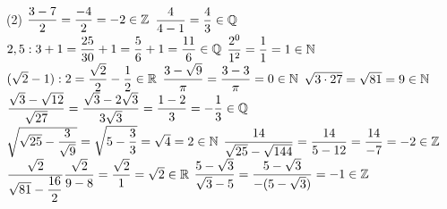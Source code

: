 \documentclass[a4paper,12pt]{report}
\begin{document}
\begin{core}
	\phantom{}
\begin{tasks}(2)
	\task $\dfrac{3-7}{2}=\dfrac{-4}{2}=-2\in \mathbb Z$
	\task $\dfrac{4}{4-1}=\dfrac{4}{3}\in \mathbb Q$
	\task $2,5: 3+1=\dfrac{25}{30}+1=\dfrac{5}{6}+1=\dfrac{11}{6}\in\mathbb Q$
	\task $\dfrac{2^0}{1^2}=\dfrac{1}{1}=1\in \mathbb N$
	\task $(\sqrt{2}-1): 2=\dfrac{\sqrt{2}}{2}-\dfrac{1}{2}\in\mathbb R$
	\task $\dfrac{3-\sqrt{9}}{\pi}=\dfrac{3-3}{\pi}=0\in \mathbb N$
	\task $\sqrt{3 \cdot 27}=\sqrt{81}=9\in \mathbb N$
	\task $\dfrac{\sqrt{3}-\sqrt{12}}{\sqrt{27}}=\dfrac{\sqrt{3}-2\sqrt{3}}{3\sqrt{3}}=\dfrac{1-2}{3}=-\dfrac{1}{3}\in\mathbb Q$
	\task $\sqrt{\sqrt{25}-\dfrac{3}{\sqrt{9}}}=\sqrt{5-\dfrac{3}{3}}=\sqrt{4}=2\in \mathbb N$
	\task $\dfrac{14}{\sqrt{25}-\sqrt{144}}=\dfrac{14}{5-12}=\dfrac{14}{-7}=-2\in\mathbb Z$
	\task $\dfrac{\sqrt{2}}{\sqrt{81}-\dfrac{16}{2}}\dfrac{\sqrt{2}}{9-8}=\dfrac{\sqrt{2}}{1}=\sqrt{2}\in \mathbb R$
	\task $\dfrac{5-\sqrt{3}}{\sqrt{3}-5}=\dfrac{5-\sqrt{3}}{-(5-\sqrt{3})}=-1\in \mathbb Z$
\end{tasks} 
\end{core}
\end{document}
